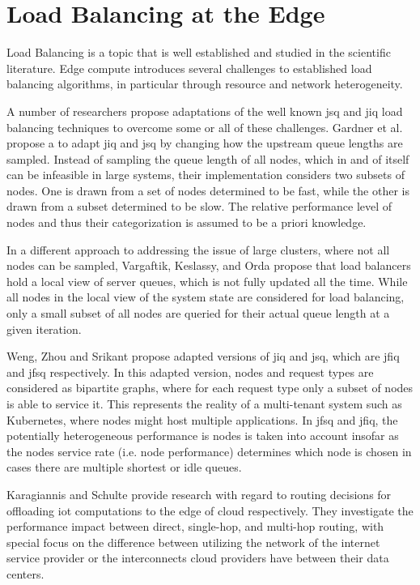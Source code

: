 \section{Load Balancing at the Edge}
Load Balancing is a topic that is well established and studied in the scientific literature.
Edge compute introduces several challenges to established load balancing algorithms, in particular through resource and network heterogeneity\cite{gardnerScalableLoadBalancing2021}.

A number of researchers propose adaptations of the well known \gls{jsq} and \gls{jiq} load balancing techniques to overcome some or all of these challenges\cite{gardnerScalableLoadBalancing2021}\cite{wengOptimalLoadBalancing2020}\cite{vargaftikLSQLoadBalancing2020}.
Gardner et al. propose a to adapt \gls{jiq} and \gls{jsq} by changing how the upstream queue lengths are sampled.
Instead of sampling the queue length of all nodes, which in and of itself can be infeasible in large systems\cite{gardnerScalableLoadBalancing2021}, their implementation considers two subsets of nodes.
One is drawn from a set of nodes determined to be fast, while the other is drawn from a subset determined to be slow.
The relative performance level of nodes and thus their categorization is assumed to be a priori knowledge.

In a different approach to addressing the issue of large clusters, where not all nodes can be sampled, Vargaftik, Keslassy, and Orda propose that load balancers hold a local view of server queues, which is not fully updated all the time\cite{vargaftikLSQLoadBalancing2020}.
While all nodes in the local view of the system state are considered for load balancing, only a small subset of all nodes are queried for their actual queue length at a given iteration.

Weng, Zhou and Srikant propose adapted versions of \gls{jiq} and \gls{jsq}, which are \gls{jfiq} and \gls{jfsq} respectively.
In this adapted version, nodes and request types are considered as bipartite graphs, where for each request type only a subset of nodes is able to service it.
This represents the reality of a multi-tenant system such as Kubernetes\cite{kubernetes}, where nodes might host multiple applications.
In \gls{jfsq} and \gls{jfiq}, the potentially heterogeneous performance is nodes is taken into account insofar as the nodes service rate (i.e. node performance) determines which node is chosen in cases there are multiple shortest or idle queues.


Karagiannis and Schulte provide research with regard to routing decisions for offloading \gls{iot} computations to the edge of cloud respectively\cite{karagiannisEdgeRoutingUsingCompute2021}.
They investigate the performance impact between direct, single-hop, and multi-hop routing, with special focus on the difference between utilizing the network of the internet service provider or the interconnects cloud providers have between their data centers.

